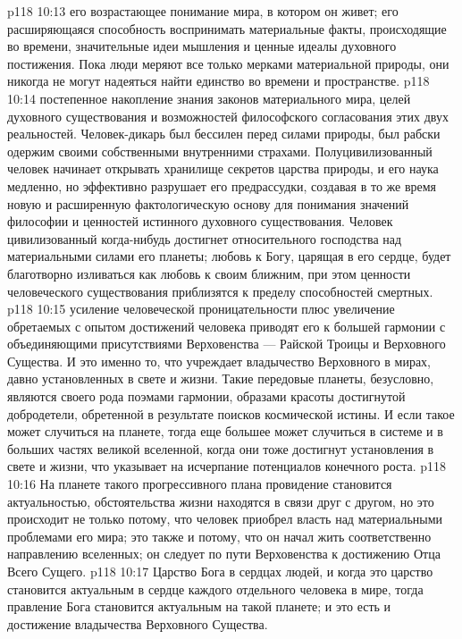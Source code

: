 \vs p118 10:13 \bibnobreakspace {} его возрастающее понимание мира, в котором он живет; его расширяющаяся способность воспринимать материальные факты, происходящие во времени, значительные идеи мышления и ценные идеалы духовного постижения. Пока люди меряют все только мерками материальной природы, они никогда не могут надеяться найти единство во времени и пространстве.
\vs p118 10:14 \bibnobreakspace {} постепенное накопление знания законов материального мира, целей духовного существования и возможностей философского согласования этих двух реальностей. Человек\hyp{}дикарь был бессилен перед силами природы, был рабски одержим своими собственными внутренними страхами. Полуцивилизованный человек начинает открывать хранилище секретов царства природы, и его наука медленно, но эффективно разрушает его предрассудки, создавая в то же время новую и расширенную фактологическую основу для понимания значений философии и ценностей истинного духовного существования. Человек цивилизованный когда\hyp{}нибудь достигнет относительного господства над материальными силами его планеты; любовь к Богу, царящая в его сердце, будет благотворно изливаться как любовь к своим ближним, при этом ценности человеческого существования приблизятся к пределу способностей смертных.
\vs p118 10:15 \bibnobreakspace {} усиление человеческой проницательности плюс увеличение обретаемых с опытом достижений человека приводят его к большей гармонии с объединяющими присутствиями Верховенства --- Райской Троицы и Верховного Существа. И это именно то, что учреждает владычество Верховного в мирах, давно установленных в свете и жизни. Такие передовые планеты, безусловно, являются своего рода поэмами гармонии, образами красоты достигнутой добродетели, обретенной в результате поисков космической истины. И если такое может случиться на планете, тогда еще большее может случиться в системе и в больших частях великой вселенной, когда они тоже достигнут установления в свете и жизни, что указывает на исчерпание потенциалов конечного роста.
\vs p118 10:16 \pc На планете такого прогрессивного плана провидение становится актуальностью, обстоятельства жизни находятся в связи друг с другом, но это происходит не только потому, что человек приобрел власть над материальными проблемами его мира; это также и потому, что он начал жить соответственно направлению вселенных; он следует по пути Верховенства к достижению Отца Всего Сущего.
\vs p118 10:17 \pc Царство Бога в сердцах людей, и когда это царство становится актуальным в сердце каждого отдельного человека в мире, тогда правление Бога становится актуальным на такой планете; и это есть и достижение владычества Верховного Существа.
